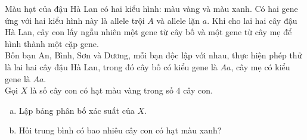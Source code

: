 \begin{bt}%

	Màu hạt của đậu Hà Lan có hai kiểu hình: màu vàng và màu xanh. Có hai gene ứng với hai kiểu hình này là allele trội $A$ và allele lặn $a$. Khi cho lai hai cây đậu Hà Lan, cây con lấy ngẫu nhiên một gene từ cây bố và một gene từ cây mẹ để hình thành một cặp gene.\\
	Bốn bạn An, Bình, Sơn và Dương, mỗi bạn độc lập với nhau, thực hiện phép thử là lai hai cây đậu Hà Lan, trong đó cây bố có kiểu gene là $Aa$, cây mẹ có kiểu gene là $Aa$.\\
	Gọi $X$ là số cây con có hạt màu vàng trong số $4$ cây con.
	\begin{enumerate}[a)]
		\item Lập bảng phân bố xác suất của $X$.
		\item Hỏi trung bình có bao nhiêu cây con có hạt màu xanh?
	\end{enumerate}
	

\end{bt}
